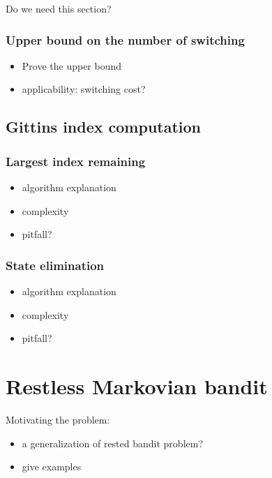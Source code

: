 Do we need this section?

\subsubsection{Upper bound on the number of switching}

\begin{itemize}
    \item Prove the upper bound
    \item applicability: switching cost?
\end{itemize}

\subsection{Gittins index computation}

\subsubsection{Largest index remaining}

\begin{itemize}
    \item algorithm explanation
    \item complexity
    \item pitfall?
\end{itemize}

\subsubsection{State elimination}

\begin{itemize}
    \item algorithm explanation
    \item complexity
    \item pitfall?
\end{itemize}

\section{Restless Markovian bandit}
\label{sec:restless_mab_pb}

Motivating the problem:
\begin{itemize}
    \item a generalization of rested bandit problem?
    \item give examples
\end{itemize}

